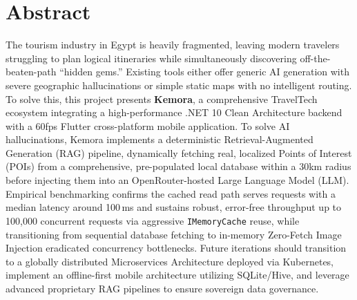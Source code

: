 \documentclass[12pt, a4paper]{report}
\begin{document}
\begin{titlepage}
\begin{center}
    \end{center}
\end{titlepage}


\chapter*{Abstract}

The tourism industry in Egypt is heavily fragmented, leaving modern travelers struggling to plan logical itineraries while simultaneously discovering off-the-beaten-path ``hidden gems.'' Existing tools either offer generic AI generation with severe geographic hallucinations or simple static maps with no intelligent routing. To solve this, this project presents \textbf{Kemora}, a comprehensive TravelTech ecosystem integrating a high-performance .NET 10 Clean Architecture backend with a 60fps Flutter cross-platform mobile application. To solve AI hallucinations, Kemora implements a deterministic Retrieval-Augmented Generation (RAG) pipeline, dynamically fetching real, localized Points of Interest (POIs) from a comprehensive, pre-populated local database within a 30km radius before injecting them into an OpenRouter-hosted Large Language Model (LLM). Empirical benchmarking confirms the cached read path serves requests with a median latency around 100\,ms and sustains robust, error-free throughput up to 100,000 concurrent requests via aggressive \texttt{IMemoryCache} reuse, while transitioning from sequential database fetching to in-memory Zero-Fetch Image Injection eradicated concurrency bottlenecks. Future iterations should transition to a globally distributed Microservices Architecture deployed via Kubernetes, implement an offline-first mobile architecture utilizing SQLite/Hive, and leverage advanced proprietary RAG pipelines to ensure sovereign data governance.

\newpage


\newpage
\tableofcontents
\newpage
\listoffigures
{}
\newpage
\listoftables
{}
\newpage














\appendix





\end{document}
